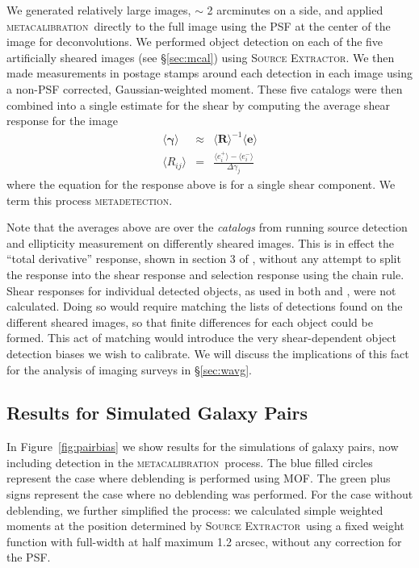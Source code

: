 \documentclass[iop, twocolappendix, appendixfloats, numberedappendix, apj]{hackemulateapj}
\newcommand{\mcal}{\textsc{metacalibration}}
\newcommand{\mdet}{\textsc{metadetection}}
\newcommand{\sx}{\textsc{Source Extractor}}
\begin{document}
We generated relatively large images, $\sim$ 2 arcminutes on a side, and applied
\mcal\ directly to the full image using the PSF at the center of the image for
deconvolutions.  We performed object detection on each of the five artificially
sheared images (see \S \ref{sec:mcal}) using \sx.  We then
made measurements in postage stamps around each detection in each image using a
non-PSF corrected, Gaussian-weighted moment.  These five catalogs were then
combined into a single estimate for the shear by computing the
average shear response for the image
\begin{eqnarray}
\langle \boldsymbol\gamma \rangle &\approx& \langle \boldsymbol{R}\rangle^{-1}\langle\boldsymbol{e}\rangle\nonumber\\
\langle R_{ij}\rangle &=& \frac{\langle e_i^{+}\rangle - \langle e_i^{-}\rangle}{\Delta\gamma_j}
\end{eqnarray}
where the equation for the response above is for a single shear component. We term this
process \mdet.

Note that the averages above are over the {\it catalogs} from running source
detection and ellipticity measurement on differently sheared images. This is in
effect the ``total derivative'' response, shown in section 3 of
\cite{SheldonMcal2017}, without any attempt to split the response into the
shear response and selection response using the chain rule.  Shear responses
for individual detected objects, as used in both \cite{SheldonMcal2017} and
\cite{HuffMcal2017}, were not calculated.  Doing so would require matching the
lists of detections found on the different sheared images, so that finite
differences for each object could be formed.  This act of matching would
introduce the very shear-dependent object detection biases we wish to
calibrate.  We will discuss the implications of this fact for the analysis of
imaging surveys in \S \ref{sec:wavg}.

\subsection{Results for Simulated Galaxy Pairs}
\label{sec:mdetpairs}

In Figure~\ref{fig:pairbias} we show results for the simulations of galaxy
pairs, now including detection in the \mcal\ process. The blue filled circles
represent the case where deblending is performed using MOF. The green plus
signs represent the case where no deblending was performed. For the case
without deblending,  we further simplified the process: we calculated
simple weighted moments at the position determined by \sx\ using a fixed weight function
with full-width at half maximum 1.2 arcsec, without any correction for the PSF.
\end{document}
